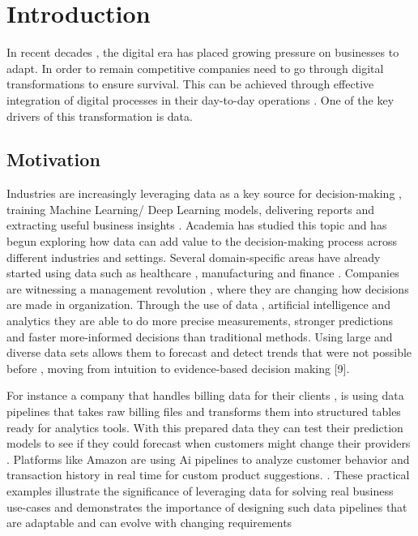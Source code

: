 \chapter{Introduction}
\label{ch:intro}
In recent decades , the digital era has placed growing pressure on businesses to adapt. In order to remain competitive companies need to go through digital transformations to ensure survival. This can be achieved through effective integration of digital processes in their day-to-day operations \cite{kraus:2021} . One of the key drivers of this transformation is data.

%
%
\section{Motivation}
\label{sec:intro:motivation}
Industries are increasingly leveraging data as a key source for decision-making , training Machine Learning/ Deep Learning models, delivering reports and extracting useful business insights \cite{munappy:2020}. Academia has studied this topic and has begun exploring how data can add value to the decision-making process across different industries and settings. Several domain-specific areas have already started using data such as healthcare , manufacturing and finance \cite{ahmed:2023} \cite{dubey:2019} \cite{heaton:2017} . Companies are witnessing a management revolution , where they are changing how decisions are made in organization. Through the use of data , artificial intelligence and analytics they are able to do more precise measurements, stronger predictions and faster more-informed decisions than traditional methods. Using large and diverse data sets allows them to forecast and detect trends that were not possible before , moving from intuition to evidence-based decision making [9].

\smallskip


For instance a company that handles billing data for their clients , is using data pipelines that takes raw billing files and transforms them into structured tables ready for analytics tools. With this prepared data they can test their prediction models to see if they could forecast when customers might change their providers \cite{gagliardelli:2023} . Platforms like Amazon are using Ai pipelines to analyze customer behavior and transaction history in real time for custom product suggestions. \cite{vangibhurathachhi:2025}. These practical examples illustrate the significance of leveraging data for solving real business use-cases and demonstrates the importance of designing such data pipelines that are adaptable and can evolve with changing requirements


